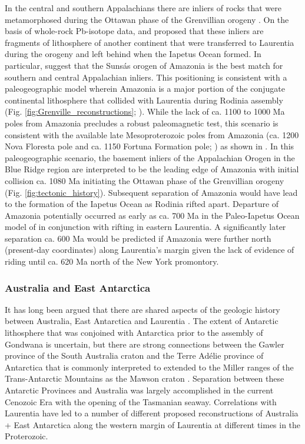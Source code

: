 \documentclass[twocolumn, switch]{article} %
\begin{document}
In the central and southern Appalachians there are inliers of rocks that were metamorphosed during the Ottawan phase of the Grenvillian orogeny \citep{McLelland2013a}. On the basis of whole-rock Pb-isotope data, \cite{Loewy2003a} and \cite{Fisher2010a} proposed that these inliers are fragments of lithosphere of another continent that were transferred to Laurentia during the orogeny and left behind when the Iapetus Ocean formed. In particular, \cite{Fisher2010a} suggest that the Suns\'as orogen of Amazonia is the best match for southern and central Appalachian inliers. This positioning is consistent with a paleogeographic model wherein Amazonia is a major portion of the conjugate continental lithosphere that collided with Laurentia during Rodinia assembly (Fig. \ref{fig:Grenville_reconstructions}; \citealp{Hoffman1991a, Evans2013b, Cawood2017a}). While the lack of ca. 1100 to 1000 Ma poles from Amazonia precludes a robust paleomagnetic test, this scenario is consistent with the available late Mesoproterozoic poles from Amazonia (ca. 1200 Nova Floresta pole and ca. 1150 Fortuna Formation pole; \citealp{DAgrella-Filho2021a}) as shown in \cite{Evans2013b}. In this paleogeographic scenario, the basement inliers of the Appalachian Orogen in the Blue Ridge region are interpreted to be the leading edge of Amazonia with initial collision ca. 1080 Ma initiating the Ottawan phase of the Grenvillian orogeny (Fig. \ref{fig:tectonic_history}). Subsequent separation of Amazonia would have lead to the formation of the Iapetus Ocean as Rodinia rifted apart. Departure of Amazonia potentially occurred as early as ca. 700 Ma in the Paleo-Iapetus Ocean model of  \citet{Robert2020a} in conjunction with rifting in eastern Laurentia. A significantly later separation ca. 600 Ma would be predicted if Amazonia were further north (present-day coordinates) along Laurentia's margin given the lack of evidence of riding until ca. 620 Ma north of the New York promontory.

\subsubsection{Australia and East Antarctica}

It has long been argued that there are shared aspects of the geologic history between Australia, East Antarctica and Laurentia \citep{Moores1991a}. The extent of Antarctic lithosphere that was conjoined with Antarctica prior to the assembly of Gondwana is uncertain, but there are strong connections between the Gawler province of the South Australia craton and the Terre Ad\'elie province of Antarctica that is commonly interpreted to extended to the Miller ranges of the Trans-Antarctic Mountains as the Mawson craton \citep{Payne2009b}.  Separation between these Antarctic Provinces and Australia was largely accomplished in the current Cenozoic Era with the opening of the Tasmanian seaway. Correlations with Laurentia have led to a number of different proposed reconstructions of Australia + East Antarctica along the western margin of Laurentia at different times in the Proterozoic.
\end{document}
